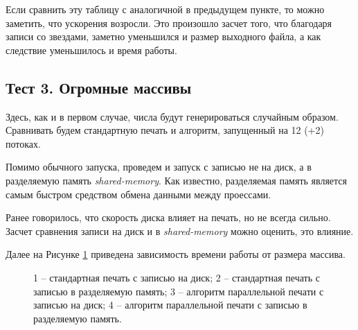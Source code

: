 Если сравнить эту таблицу с аналогичной в предыдущем пункте, то можно заметить, что ускорения возросли.
Это произошло засчет того, что благодаря записи со звездами, заметно уменьшился и размер выходного файла, а как следствие уменьшилось и время работы.

\subsection{Тест 3. Огромные массивы} \label{subsec2:3}
Здесь, как и в первом случае, числа будут генерироваться случайным образом.
Сравнивать будем стандартную печать и алгоритм, запущенный на 12 (+2) потоках.

Помимо обычного запуска, проведем и запуск с записью не на диск, а в разделяемую память \textit{shared-memory}.
Как известно, разделяемая память является самым быстром средством обмена данными между проессами.

Ранее говорилось, что скорость диска влияет на печать, но не всегда сильно.
Засчет сравнения записи на диск и в \textit{shared-memory} можно оценить, это влияние.

Далее на Рисунке \ref{grap} приведена зависимость времени работы от размера массива.
\begin{figure}[H]
\caption{
1 -- стандартная печать с записью на диск;
2 -- стандартная печать с записью в разделяемую память;
3 -- алгоритм параллельной печати с записью на диск;
4 -- алгоритм параллельной печати с записью в разделяемую память.} \label{grap}
\end{figure}

